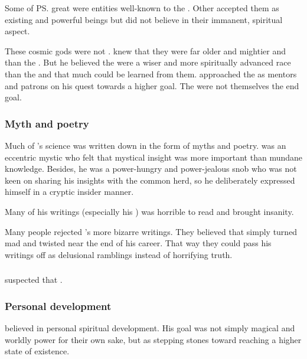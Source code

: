 Some of \ps{\Sethicus} great  were entities well-known to the \ophidians.
Other \ophidians accepted them as existing and powerful beings but did not believe in their immanent, spiritual aspect. 

These cosmic gods were not \xss. 
\Sethicus knew that they were far older and mightier and  than the \xss. 
But he believed the \xss were a wiser and more spiritually advanced race than the \ophidians and that much could be learned from them. 
\Sethicus approached the \xss as mentors and patrons on his quest towards a higher goal. 
The \xss were not themselves the end goal. 





\subsubsection{Myth and poetry}
Much of \Sethicus's science was written down in the form of myths and poetry. 
\Sethicus was an eccentric mystic who felt that mystical insight was more important than mundane knowledge. 
Besides, he was a power-hungry and power-jealous snob who was not keen on sharing his insights with the common herd, so he deliberately expressed himself in a cryptic insider manner. 

Many of his writings (especially his ) was horrible to read and brought insanity. 

Many people rejected \Sethicus's more bizarre writings. 
They believed that \Sethicus simply turned mad and twisted near the end of his career.
That way they could pass his writings off as delusional ramblings instead of horrifying truth. 





\subsubsection{\Ophidians}
\Sethicus suspected that . 





\subsubsection{Personal development}
\Sethicus believed in personal spiritual development. 
His goal was not simply magical and worldly power for their own sake, but as stepping stones toward reaching a higher state of existence. 

